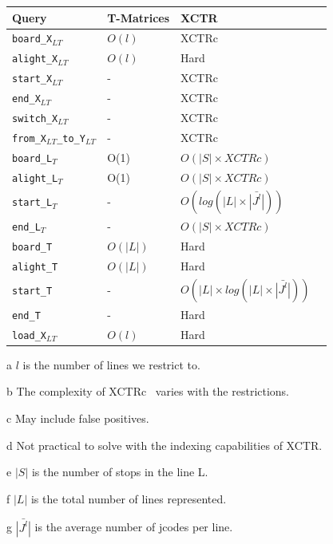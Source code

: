 \documentclass[runningheads]{llncs}
\newcommand{\acumm}{T-Matrices} %
\newcommand{\ctr}{XCTR}
\newcommand{\ctrq}{XCTRc}
\begin{document}
\begin{threeparttable}
\centering
\caption{Efficiency of \acumm~and \ctr~against the queries described in Section~\ref{sec:rq}}
\label{tab:queries}
\begin{tabular}{|l|l|l|}
\hline
Query &  \acumm & \ctr\\
\hline
\texttt{board\_X$_{LT}$} & $O(l)$\tnote{a} & \ctrq\tnote{b} \\
\texttt{alight\_X$_{LT}$} & $O(l)$\tnote{a} & Hard\tnote{cd} \\
\texttt{start\_X$_{LT}$} & - & \ctrq\tnote{b} \\
\texttt{end\_X$_{LT}$} & - & \ctrq\tnote{b} \\
\texttt{switch\_X$_{LT}$} & - & \ctrq\tnote{b} \\
\texttt{from\_X$_{LT}$\_to\_Y$_{LT}$} & - & \ctrq\tnote{b} \\
\texttt{board\_L$_T$} & O(1) & $O(|S| \times \ctrq)$\tnote{be} \\
\texttt{alight\_L$_T$} & O(1) & $O(|S| \times \ctrq)$\tnote{bce} \\
\texttt{start\_L$_T$} & - & $O(log(|L|\times\bar{|J^l|}))$\tnote{fg} \\
\texttt{end\_L$_T$} & - & $O(|S| \times \ctrq)$\tnote{be} \\
\texttt{board\_T} & $O(|L|)$\tnote{f} & Hard\tnote{d} \\
\texttt{alight\_T} & $O(|L|)$\tnote{f} & Hard\tnote{cd} \\
\texttt{start\_T} & - & $O(|L| \times log(|L|\times\bar{|J^l|}))$\tnote{fg}~~ \\
\texttt{end\_T} & - & Hard\tnote{d} \\
\texttt{load\_X$_{LT}$} & $O(l)$\tnote{a} & Hard\tnote{cd} \\
\hline
\end{tabular}

\begin{tablenotes}
\item[a] $l$ is the number of lines we restrict to.
\item[b] The complexity of \ctrq~ varies with the restrictions.
\item[c] May include false positives.
\item[d] Not practical to solve with the indexing capabilities of \ctr.
\item[e] $|S|$ is the number of stops in the line L.
\item[f] $|L|$ is the total number of lines represented.
\item[g] $\bar{|J^l|}$ is the average number of jcodes per line.
\end{tablenotes}
\end{threeparttable}
\end{document}
